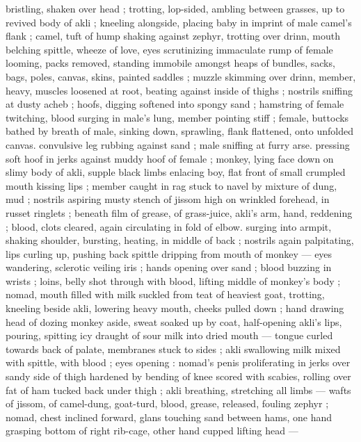 bristling, shaken over head ; trotting, lop-sided, ambling between 
grasses, up to revived body of akli ; kneeling alongside, placing baby 
in imprint of male camel's flank ; camel, tuft of hump shaking against 
zephyr, trotting over drinn, mouth belching spittle, wheeze of love, 
eyes scrutinizing immaculate rump of female looming, packs 
removed, standing immobile amongst heaps of bundles, sacks, bags, 
poles, canvas, skins, painted saddles ; muzzle skimming over drinn, 
member, heavy, muscles loosened at root, beating against inside of 
thighs ; nostrils sniffing at dusty acheb ; hoofs, digging softened into 
spongy sand ; hamstring of female twitching, blood surging in male's 
lung, member pointing stiff ; female, buttocks bathed by breath of 
male, sinking down, sprawling, flank flattened, onto unfolded canvas. 
convulsive leg rubbing against sand ; male sniffing at furry arse. 
pressing soft hoof in jerks against muddy hoof of female ; monkey, 
lying face down on slimy body of akli, supple black limbs enlacing 
boy, flat front of small crumpled mouth kissing lips ; member caught 
in rag stuck to navel by mixture of dung, mud ; nostrils aspiring 
musty stench of jissom high on wrinkled forehead, in russet ringlets 
; beneath film of grease, of grass-juice, akli's arm, hand, reddening 
; blood, clots cleared, again circulating in fold of elbow. surging into 
armpit, shaking shoulder, bursting, heating, in middle of back ; 
nostrils again palpitating, lips curling up, pushing back spittle 
dripping from mouth of monkey --- eyes wandering, sclerotic veiling 
iris ; hands opening over sand ; blood buzzing in wrists ; loins, belly 
shot through with blood, lifting middle of monkey's body ; nomad, 
mouth filled with milk suckled from teat of heaviest goat, trotting, 
kneeling beside akli, lowering heavy mouth, cheeks pulled down ; 
hand drawing head of dozing monkey aside, sweat soaked up by 
coat, half-opening akli's lips, pouring, spitting icy draught of sour 
milk into dried mouth --- tongue curled towards back of palate, 
membranes stuck to sides ; akli swallowing milk mixed with spittle, 
with blood ; eyes opening : nomad's penis proliferating in jerks over 
sandy side of thigh hardened by bending of knee scored with 
scabies, rolling over fat of ham tucked back under thigh ; akli 
breathing, stretching all limbs --- wafts of jissom, of camel-dung, 
goat-turd, blood, grease, released, fouling zephyr ; nomad, chest 
inclined forward, glans touching sand between hams, one hand 
grasping bottom of right rib-cage, other hand cupped lifting head --- 

